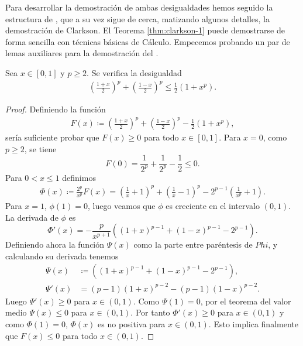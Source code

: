 Para desarrollar la demostración de ambas desigualdades hemos seguido la estructura de \cite{hewitt}, que a su vez sigue de cerca, matizando algunos detalles, la demostración de Clarkson. El Teorema \ref{thm:clarkson-1} puede demostrarse de forma sencilla con técnicas básicas de Cálculo. Empecemos probando un par de lemas auxiliares para la demostración del .

\begin{lemma} \label{lema:clarkson-1}
    Sea $ x \in [0, 1] $ y $ p \geq 2 $. Se verifica la desigualdad
    \begin{align}
        \left( \frac{1+x}{2} \right)^p + \left( \frac{1-x}{2} \right)^p \leq \frac{1}{2} (1 + x^p).
    \end{align}
\end{lemma}
\begin{proof}
    Definiendo la función
    \begin{align}
        F(x) \coloneq \left( \frac{1+x}{2} \right)^p + \left( \frac{1-x}{2} \right)^p - \frac{1}{2} (1 + x^p),
    \end{align}
    sería suficiente probar que $ F(x) \geq 0 $ para todo $ x \in [0, 1] $. Para $ x = 0 $, como $ p \geq 2 $, se tiene 
    \begin{equation}
        F(0) = \frac{1}{2^p} + \frac{1}{2^p} - \frac{1}{2} \leq 0.
    \end{equation}
    Para $ 0 < x \leq 1 $ definimos
    \begin{align}
        \Phi(x) \coloneq \frac{2^p}{x^p} F(x) = \left( \frac{1}{x} + 1 \right)^p + \left( \frac{1}{x} - 1 \right)^p - 2^{p-1} \left( \frac{1}{x^p} + 1 \right).
    \end{align}
    Para $ x = 1 $, $ \phi(1) = 0 $, luego veamos que $ \phi $ es creciente en el intervalo $ (0, 1) $. La derivada de $ \phi $ es
    \begin{equation}
        \Phi'(x) = -\frac{p}{x^{p+1}} \left( (1+x)^{p-1} + (1-x)^{p-1} - 2^{p-1} \right).
    \end{equation}
    Definiendo ahora la función $ \Psi(x) $ como la parte entre paréntesis de $ Phi$, y calculando su derivada tenemos
    \begin{equation}
    \begin{split}
        \Psi(x) &\coloneq \left( (1+x)^{p-1} + (1-x)^{p-1} - 2^{p-1} \right), \\
        \Psi'(x) &= (p-1)(1+x)^{p-2} - (p-1)(1-x)^{p-2}.
    \end{split}
    \end{equation}
    Luego $ \Psi'(x) \geq 0 $ para $ x \in (0, 1) $. Como $ \Psi(1) = 0 $, por el teorema del valor medio $ \Psi(x) \leq 0 $ para $ x \in (0, 1) $. Por tanto $ \Phi'(x) \geq 0 $ para $ x \in (0, 1) $ y como $ \Phi(1) = 0 $, $ \Phi(x) $ es no positiva para $ x \in (0, 1) $. Esto implica finalmente que $ F(x) \leq 0 $ para todo $ x \in (0, 1) $.
\end{proof}

